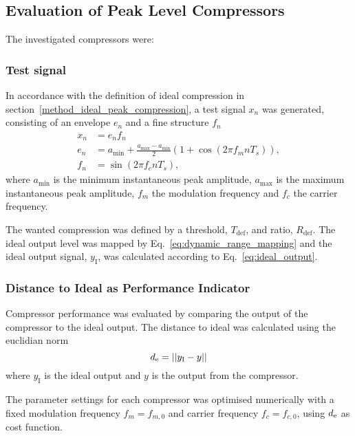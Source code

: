 \documentclass[../main2.tex]{subfiles}
\providecommand{\rootdir}{..}
\begin{document}
\subsection{Evaluation of Peak Level Compressors}\label{method_peak_compressors}
The investigated compressors were:



\subsubsection{Test signal}\label{method_test_signal}
In accordance with the definition of ideal compression in section~\ref{method_ideal_peak_compression}, a test signal $x_n$ was generated, consisting of an envelope $e_n$ and a fine structure $f_n$
\begin{equation}
\begin{split}
	x_n &=e_nf_n\\
	e_n &= a_\text{min} + \frac{a_\text{max}- a_\text{min}}{2} \left(1 + \cos(2 \pi f_m n T_s) \right), \\
	f_n &= \sin(2 \pi f_c n T_s),
\end{split} \label{eq:test_signal}
\end{equation}
where $a_\text{min}$ is the minimum instantaneous peak amplitude, $a_\text{max}$ is the maximum instantaneous peak amplitude, $f_m$ the modulation frequency and $f_c$ the carrier frequency.

The wanted compression was defined by a threshold, $T_\text{def}$, and ratio, $R_\text{def}$. The ideal output level was mapped by Eq.~\eqref{eq:dynamic_range_mapping} and the ideal output signal, $y_\text{I}$, was calculated according to Eq.~\eqref{eq:ideal_output}.

\subsubsection{Distance to Ideal as Performance Indicator}\label{method_dist_ideal}
Compressor performance was evaluated by comparing the output of the compressor to the ideal output. The distance to ideal was calculated using the euclidian norm
\begin{equation}
d_\text{e} = ||y_\text{I} - y||
\end{equation}
where $y_\text{I}$ is the ideal output and $y$ is the output from the compressor.

The parameter settings for each compressor was optimised numerically with a fixed modulation frequency $f_m = f_{m,0}$ and carrier frequency $f_c = f_{c,0}$, using $d_\text{e}$ as cost function.
\end{document}
